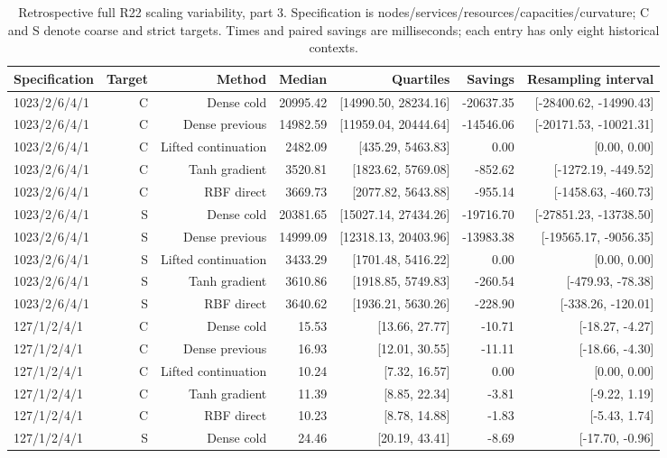 \begin{table}[tbp]\centering\scriptsize
\caption{Retrospective full R22 scaling variability, part 3. Specification is nodes/services/resources/capacities/curvature; C and S denote coarse and strict targets. Times and paired savings are milliseconds; each entry has only eight historical contexts.}
\label{tab:r24-old-scaling-3}
\begin{tabular}{lrrrrrr}
\toprule
Specification & Target & Method & Median & Quartiles & Savings & Resampling interval\\
\midrule
1023/2/6/4/1 & C & Dense cold & 20995.42 & [14990.50, 28234.16] & -20637.35 & [-28400.62, -14990.43]\\
1023/2/6/4/1 & C & Dense previous & 14982.59 & [11959.04, 20444.64] & -14546.06 & [-20171.53, -10021.31]\\
1023/2/6/4/1 & C & Lifted continuation & 2482.09 & [435.29, 5463.83] & 0.00 & [0.00, 0.00]\\
1023/2/6/4/1 & C & Tanh gradient & 3520.81 & [1823.62, 5769.08] & -852.62 & [-1272.19, -449.52]\\
1023/2/6/4/1 & C & RBF direct & 3669.73 & [2077.82, 5643.88] & -955.14 & [-1458.63, -460.73]\\
1023/2/6/4/1 & S & Dense cold & 20381.65 & [15027.14, 27434.26] & -19716.70 & [-27851.23, -13738.50]\\
1023/2/6/4/1 & S & Dense previous & 14999.09 & [12318.13, 20403.96] & -13983.38 & [-19565.17, -9056.35]\\
1023/2/6/4/1 & S & Lifted continuation & 3433.29 & [1701.48, 5416.22] & 0.00 & [0.00, 0.00]\\
1023/2/6/4/1 & S & Tanh gradient & 3610.86 & [1918.85, 5749.83] & -260.54 & [-479.93, -78.38]\\
1023/2/6/4/1 & S & RBF direct & 3640.62 & [1936.21, 5630.26] & -228.90 & [-338.26, -120.01]\\
127/1/2/4/1 & C & Dense cold & 15.53 & [13.66, 27.77] & -10.71 & [-18.27, -4.27]\\
127/1/2/4/1 & C & Dense previous & 16.93 & [12.01, 30.55] & -11.11 & [-18.66, -4.30]\\
127/1/2/4/1 & C & Lifted continuation & 10.24 & [7.32, 16.57] & 0.00 & [0.00, 0.00]\\
127/1/2/4/1 & C & Tanh gradient & 11.39 & [8.85, 22.34] & -3.81 & [-9.22, 1.19]\\
127/1/2/4/1 & C & RBF direct & 10.23 & [8.78, 14.88] & -1.83 & [-5.43, 1.74]\\
127/1/2/4/1 & S & Dense cold & 24.46 & [20.19, 43.41] & -8.69 & [-17.70, -0.96]\\

\end{tabular}
\end{table}
